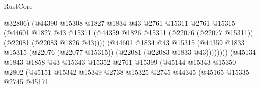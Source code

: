\begin{lexlean}{RustCore}
\begin{coremodule}
                                            @32806)
                                          (@44390
                                            @15308
                                            @1827
                                            @1834
                                            @43
                                            @2761
                                            @15311
                                            @2761
                                            @15315
                                            (@44601
                                              @1827
                                              @43
                                              @15311
                                              (@44359
                                                @1826
                                                @15311
                                                (@22076 (@22077 @15311))
                                                (@22081 (@22083 @1826 @43))))
                                            (@44601
                                              @1834
                                              @43
                                              @15315
                                              (@44359
                                                @1833
                                                @15315
                                                (@22076 (@22077 @15315))
                                                (@22081 (@22083 @1833 @43))))))))
                                    (@45134
                                      @1843
                                      @1858
                                      @43
                                      @15343
                                      @15352
                                      @2761
                                      @15399
                                      (@45144
                                        @15343
                                        @15350
                                        @2802
                                        (@45151
                                          @15342
                                          @15349
                                          @2738
                                          @15325
                                          @2745
                                          @44345
                                          (@45165
                                            @15335
                                            @2745
                                            @45171

\end{coremodule}
\end{lexlean}
